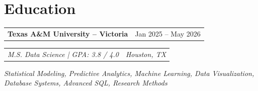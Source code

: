 \documentclass[10pt,letterpaper]{article}
\makeatletter
\newcommand{\roleheading}[2]{%
  \begin{tabularx}{\linewidth}{@{}X r@{}}
    \textbf{\small\color{dark}#1} & \small\textcolor{muted}{#2}
  \end{tabularx}\vspace{-1pt}\par
}
\newcommand{\orgline}[2]{%
  \begin{tabularx}{\linewidth}{@{}X r@{}}
    \textit{\footnotesize\textcolor{muted}{#1}} &
    \textit{\footnotesize\textcolor{muted}{#2}}
  \end{tabularx}\vspace{1pt}\par
}
\makeatother
\begin{document}
\section{Education}

\roleheading{Texas A\&M University -- Victoria}{Jan 2025 -- May 2026}
\orgline{M.S. Data Science \;|\; GPA: 3.8 / 4.0}{Houston, TX}
\vspace{1pt}
\footnotesize\textit{Statistical Modeling, Predictive Analytics, Machine Learning, Data
Visualization, Database Systems, Advanced SQL, Research Methods}
\end{document}
